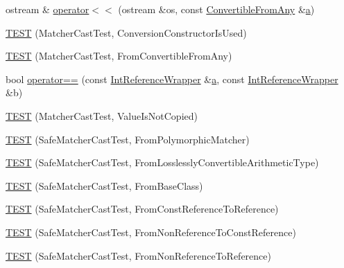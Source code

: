 \begin{DoxyCompactItemize}
\item 
ostream \& \hyperlink{namespacetesting_1_1gmock__matchers__test_a2a2abd1e49c201ae26ed96211d4225eb}{operator$<$$<$} (ostream \&os, const \hyperlink{structtesting_1_1gmock__matchers__test_1_1_convertible_from_any}{Convertible\+From\+Any} \&\hyperlink{_07copy_08_2_read_camera_model_8m_a551a3d351eadcc0b9b1a2f24f0fb5ea0}{a})
\item 
\hyperlink{namespacetesting_1_1gmock__matchers__test_a42e4d7d26704516436281897cb41bb1b}{T\+E\+ST} (Matcher\+Cast\+Test, Conversion\+Constructor\+Is\+Used)
\item 
\hyperlink{namespacetesting_1_1gmock__matchers__test_ae51787fccc0f0a27e3725039c6cd48dc}{T\+E\+ST} (Matcher\+Cast\+Test, From\+Convertible\+From\+Any)
\item 
bool \hyperlink{namespacetesting_1_1gmock__matchers__test_a33c068c32bf5118e5be92771b146db77}{operator==} (const \hyperlink{structtesting_1_1gmock__matchers__test_1_1_int_reference_wrapper}{Int\+Reference\+Wrapper} \&\hyperlink{_07copy_08_2_read_camera_model_8m_a551a3d351eadcc0b9b1a2f24f0fb5ea0}{a}, const \hyperlink{structtesting_1_1gmock__matchers__test_1_1_int_reference_wrapper}{Int\+Reference\+Wrapper} \&b)
\item 
\hyperlink{namespacetesting_1_1gmock__matchers__test_ae99c08c8a815964b61f98a4785cf79b5}{T\+E\+ST} (Matcher\+Cast\+Test, Value\+Is\+Not\+Copied)
\item 
\hyperlink{namespacetesting_1_1gmock__matchers__test_a29c04361c022a71711dbf9d3cf2a5050}{T\+E\+ST} (Safe\+Matcher\+Cast\+Test, From\+Polymorphic\+Matcher)
\item 
\hyperlink{namespacetesting_1_1gmock__matchers__test_a70bbe53742db988a828d9e8201e34770}{T\+E\+ST} (Safe\+Matcher\+Cast\+Test, From\+Losslessly\+Convertible\+Arithmetic\+Type)
\item 
\hyperlink{namespacetesting_1_1gmock__matchers__test_a937469149aee65efde526091af1e4f78}{T\+E\+ST} (Safe\+Matcher\+Cast\+Test, From\+Base\+Class)
\item 
\hyperlink{namespacetesting_1_1gmock__matchers__test_a14ba7c67551222321056e4da6708010f}{T\+E\+ST} (Safe\+Matcher\+Cast\+Test, From\+Const\+Reference\+To\+Reference)
\item 
\hyperlink{namespacetesting_1_1gmock__matchers__test_ad53741423311d4f76d9d980f59ec8d65}{T\+E\+ST} (Safe\+Matcher\+Cast\+Test, From\+Non\+Reference\+To\+Const\+Reference)
\item 
\hyperlink{namespacetesting_1_1gmock__matchers__test_a362ce5b2b395dfd6363e4d80b49951f1}{T\+E\+ST} (Safe\+Matcher\+Cast\+Test, From\+Non\+Reference\+To\+Reference)

\end{DoxyCompactItemize}
